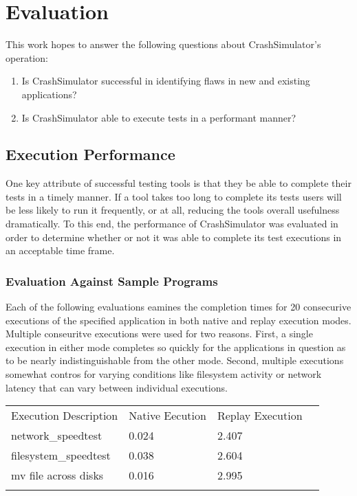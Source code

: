 \section{Evaluation}

    This work hopes to answer the following questions about CrashSimulator's operation:

        \begin{enumerate}
            \item{Is CrashSimulator successful in identifying flaws in new and existing applications?}
            \item{Is CrashSimulator able to execute tests in a performant manner?}
        \end{enumerate}

    \subsection{Execution Performance}

        One key attribute of successful testing tools is that they be able to complete their tests in a timely manner.
        If a tool takes too long to complete its tests users will be less likely to run it frequently, or at all,
        reducing the tools overall usefulness dramatically. To this end, the performance of CrashSimulator was evaluated
        in order to determine whether or not it was able to complete its test executions in an acceptable time frame.

        \subsubsection{Evaluation Against Sample Programs}

        Each of the following evaluations eamines the completion times for 20 consecurive executions of the specified
        application in both native and replay execution modes.  Multiple conseuritve executions were used for two
        reasons.  First, a single execution in either mode completes so quickly for the applications in question as to
        be nearly indistinguishable from the other mode.  Second, multiple executions somewhat contros for varying
        conditions like filesystem activity or network latency that can vary between individual executions.

            \begin{table}[H]
                \scriptsize{}
                \begin{tabular}{l  l  l  l}
                    \toprule{}
                        Execution Description & Native Eecution & Replay Execution\\
                        network\_speedtest & 0.024 & 2.407 \\
                        filesystem\_speedtest & 0.038 & 2.604 \\
                        mv file across disks & 0.016 & 2.995 \\
                    \bottomrule{}
                \end{tabular}
            \end{table}

